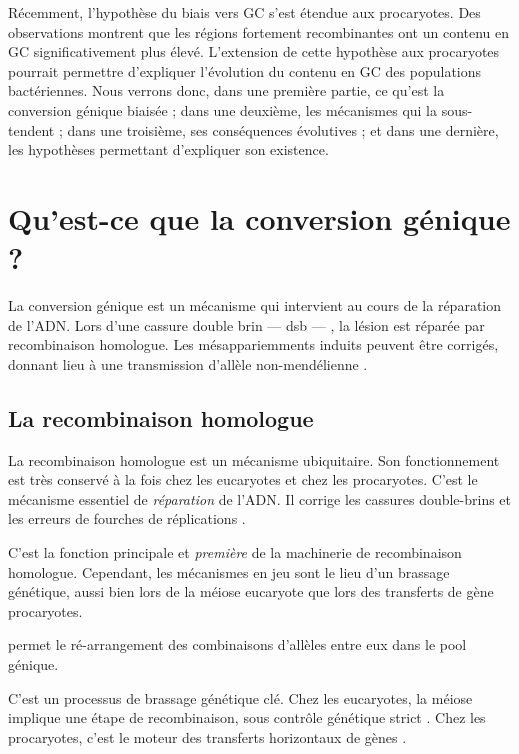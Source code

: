 \documentclass[11pt]{scrartcl}
\begin{document}
Récemment, l'hypothèse du biais vers GC s'est étendue aux procaryotes. Des
observations montrent que les régions fortement recombinantes ont un contenu en
GC significativement plus élevé. L'extension de cette hypothèse aux procaryotes
pourrait permettre d'expliquer l'évolution du contenu en GC des populations
bactériennes. Nous verrons donc, dans une première partie, ce qu'est la
conversion génique biaisée ; dans une deuxième, les mécanismes qui la
sous-tendent ; dans une troisième, ses conséquences évolutives ; et dans une
dernière, les hypothèses permettant d'expliquer son existence.


\section{Qu'est-ce que la conversion génique ?}
\label{sec:orgheadline5}

La conversion génique est un mécanisme qui intervient au cours de la réparation
de l'ADN. Lors d'une cassure double brin --- \ac{dsb} --- , la lésion est réparée par
recombinaison homologue. Les mésappariemments induits peuvent être corrigés,
donnant lieu à une transmission d'allèle non-mendélienne \cite{chen_mechanism_2008}. 

\subsection{La recombinaison homologue}
\label{sec:orgheadline2}

La recombinaison homologue est un mécanisme ubiquitaire. Son fonctionnement est
très conservé à la fois chez les eucaryotes et chez les procaryotes. C'est le
mécanisme essentiel de \emph{réparation} de l'ADN. Il corrige les cassures
double-brins et les erreurs de fourches de réplications
\cite{lusetti_bacterial_2002}.

C'est la fonction principale et \emph{première} de la machinerie de recombinaison
homologue. Cependant, les mécanismes en jeu sont le lieu d'un brassage
génétique, aussi bien lors de la méiose eucaryote que lors des transferts de
gène procaryotes\cite{redfield_bacteria_2001}.  

 permet le ré-arrangement des combinaisons
d'allèles entre eux dans le pool génique. 

C'est un processus de brassage génétique clé. Chez les eucaryotes, la méiose
implique une étape de recombinaison, sous contrôle génétique strict
\cite{webster_direct_2012}. Chez les procaryotes, c'est le moteur des transferts
horizontaux de gènes \cite{didelot_impact_2010}.
\end{document}
